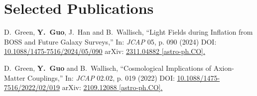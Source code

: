 \documentclass[letterpaper,12pt]{article}
\begin{document}
\section{Selected Publications}

D.~Green, \textbf{Y.~Guo}, J.~Han and B.~Wallisch,
``Light Fields during Inflation from BOSS and Future Galaxy Surveys,''
In: \textit{JCAP} 05, p. 090 (2024)
DOI: \href{https://iopscience.iop.org/article/10.1088/1475-7516/2024/05/090}{10.1088/1475-7516/2024/05/090}
arXiv: \href{https://arxiv.org/abs/2311.04882}{2311.04882 [astro-ph.CO].}

D.~Green, \textbf{Y.~Guo} and B.~Wallisch,
``Cosmological Implications of Axion-Matter Couplings,''
In: \textit{JCAP} 02.02, p. 019 (2022)
DOI: \href{https://iopscience.iop.org/article/10.1088/1475-7516/2022/02/019}{10.1088/1475-7516/2022/02/019}
arXiv: \href{https://arxiv.org/abs/2109.12088?context=hep-ph}{2109.12088 [astro-ph.CO].}
\end{document}
